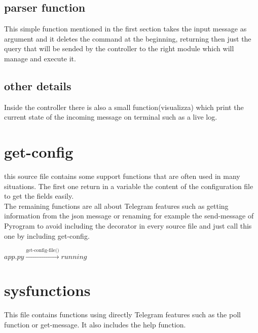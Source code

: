 \documentclass{article}
\begin{document}
\subsection{parser function}
This simple function mentioned in the first section takes the input message as argument and it deletes the command at the beginning, returning then just the query that will be sended by the controller to the right module which will manage and execute it.

\subsection{other details}
Inside the controller there is also a small function(visualizza) which print the current state of the incoming message on terminal such as a live log. \\

\section{get-config}
this source file contains some support functions that are often used in many situations. The first one return in a variable the content of the configuration file to get the fields easily. \\
The remaining functions are all about Telegram features such as getting information from the json message or renaming for example the send-message of Pyrogram to avoid including the decorator in every source file and just call this one by including get-config.
\begin{center} $app.py \xrightarrow{\text{get-config-file()}} running$ \end{center}

\section{sysfunctions}
This file contains functions using directly Telegram features such as the poll function or get-message. It also includes the help function.
\end{document}
